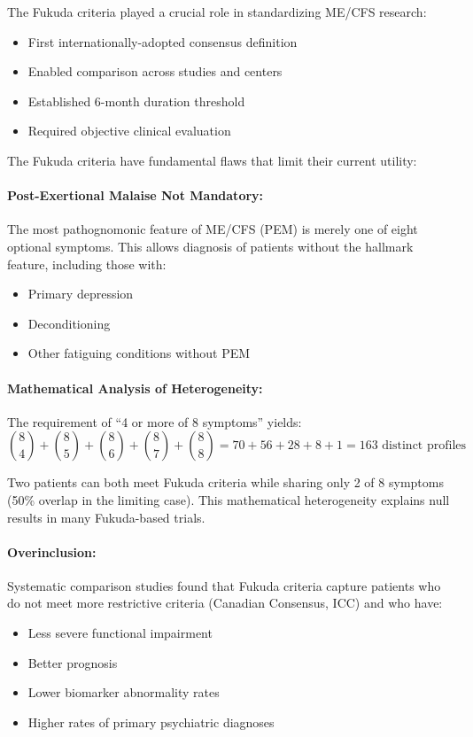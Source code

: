\begin{observation}
The Fukuda criteria played a crucial role in standardizing ME/CFS research:
\begin{itemize}
    \item First internationally-adopted consensus definition
    \item Enabled comparison across studies and centers
    \item Established 6-month duration threshold
    \item Required objective clinical evaluation
\end{itemize}
\end{observation}

\begin{warning}
\label{warn:fukuda-limitations}
The Fukuda criteria have fundamental flaws that limit their current utility:

\paragraph{Post-Exertional Malaise Not Mandatory:}
The most pathognomonic feature of ME/CFS (PEM) is merely one of eight optional symptoms. This allows diagnosis of patients without the hallmark feature, including those with:
\begin{itemize}
    \item Primary depression
    \item Deconditioning
    \item Other fatiguing conditions without PEM
\end{itemize}

\paragraph{Mathematical Analysis of Heterogeneity:}
The requirement of ``4 or more of 8 symptoms'' yields:
\begin{equation}
\binom{8}{4} + \binom{8}{5} + \binom{8}{6} + \binom{8}{7} + \binom{8}{8} = 70 + 56 + 28 + 8 + 1 = 163 \text{ distinct profiles}
\end{equation}

Two patients can both meet Fukuda criteria while sharing only 2 of 8 symptoms (50\% overlap in the limiting case). This mathematical heterogeneity explains null results in many Fukuda-based trials.

\paragraph{Overinclusion:}
Systematic comparison studies found that Fukuda criteria capture patients who do not meet more restrictive criteria (Canadian Consensus, ICC) and who have:
\begin{itemize}
    \item Less severe functional impairment
    \item Better prognosis
    \item Lower biomarker abnormality rates
    \item Higher rates of primary psychiatric diagnoses
\end{itemize}


\end{warning}
